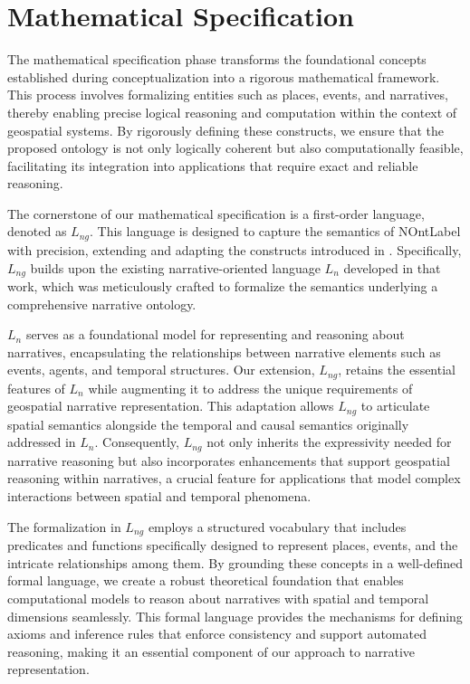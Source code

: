 \section{Mathematical Specification}\label{IV-sec:mathematical-specification}

The mathematical specification phase transforms the foundational concepts established during conceptualization into a rigorous mathematical framework. This process involves formalizing entities such as places, events, and narratives, thereby enabling precise logical reasoning and computation within the context of geospatial systems. By rigorously defining these constructs, we ensure that the proposed ontology is not only logically coherent but also computationally feasible, facilitating its integration into applications that require exact and reliable reasoning.

The cornerstone of our mathematical specification is a first-order language, denoted as $L_{ng}$. This language is designed to capture the semantics of \acrshort{NOntLabel} with precision, extending and adapting the constructs introduced in \cite{meghiniRepresentingNarrativesDigital2021}. Specifically, $L_{ng}$ builds upon the existing narrative-oriented language $L_n$ developed in that work, which was meticulously crafted to formalize the semantics underlying a comprehensive narrative ontology.

$L_n$ serves as a foundational model for representing and reasoning about narratives, encapsulating the relationships between narrative elements such as events, agents, and temporal structures. Our extension, $L_{ng}$, retains the essential features of $L_n$ while augmenting it to address the unique requirements of geospatial narrative representation. This adaptation allows $L_{ng}$ to articulate spatial semantics alongside the temporal and causal semantics originally addressed in $L_n$. Consequently, $L_{ng}$ not only inherits the expressivity needed for narrative reasoning but also incorporates enhancements that support geospatial reasoning within narratives, a crucial feature for applications that model complex interactions between spatial and temporal phenomena.

The formalization in $L_{ng}$ employs a structured vocabulary that includes predicates and functions specifically designed to represent places, events, and the intricate relationships among them. By grounding these concepts in a well-defined formal language, we create a robust theoretical foundation that enables computational models to reason about narratives with spatial and temporal dimensions seamlessly. This formal language provides the mechanisms for defining axioms and inference rules that enforce consistency and support automated reasoning, making it an essential component of our approach to narrative representation.

